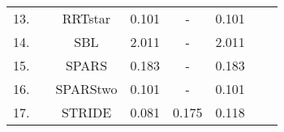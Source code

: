 \begin{table}[H]
\begin{tabular}{|c|c|c|c|c|c|ll}
\cellcolor[HTML]{EFEFEF}13.  &                                                                                                                                & \cellcolor[HTML]{EFEFEF}RRTstar     & \cellcolor[HTML]{EFEFEF}0.101                                                                  & \cellcolor[HTML]{EFEFEF}-                                                                      & \cellcolor[HTML]{EFEFEF}0.101                                                                  &  &  \\ \cline{1-1} \cline{3-6}
\cellcolor[HTML]{FFCCC9}14.  &                                                                                                                                & \cellcolor[HTML]{FFCCC9}SBL         & \cellcolor[HTML]{FFCCC9}2.011                                                                  & \cellcolor[HTML]{FFCCC9}-                                                                      & \cellcolor[HTML]{FFCCC9}2.011                                                                  &  &  \\ \cline{1-1} \cline{3-6}
\cellcolor[HTML]{EFEFEF}15.  &                                                                                                                                & \cellcolor[HTML]{EFEFEF}SPARS       & \cellcolor[HTML]{EFEFEF}0.183                                                                  & \cellcolor[HTML]{EFEFEF}-                                                                      & \cellcolor[HTML]{EFEFEF}0.183                                                                  &  &  \\ \cline{1-1} \cline{3-6}
\cellcolor[HTML]{C0C0C0}16.  &                                                                                                                                & \cellcolor[HTML]{C0C0C0}SPARStwo    & \cellcolor[HTML]{C0C0C0}0.101                                                                  & \cellcolor[HTML]{C0C0C0}-                                                                      & \cellcolor[HTML]{C0C0C0}0.101                                                                  &  &  \\ \cline{1-1} \cline{3-6}
\cellcolor[HTML]{EFEFEF}17.  &                                                                                                                                & \cellcolor[HTML]{EFEFEF}STRIDE      & \cellcolor[HTML]{EFEFEF}0.081                                                                  & \cellcolor[HTML]{EFEFEF}0.175                                                                  & \cellcolor[HTML]{EFEFEF}0.118                                                                  &  &  \\ \cline{1-1} \cline{3-6}

\end{tabular}
\end{table}

